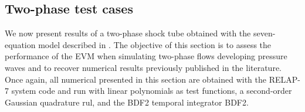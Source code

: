 \documentclass{inputs/mc2015}
\begin{document}
\subsection{Two-phase test cases} \label{sec:2-phase-problems}
%
We now present results of a two-phase shock tube obtained with the seven-equation model described in . %
The objective of this section is to assess the performance of the EVM when simulating two-phase flows developing pressure waves and to recover numerical results previously published in the literature. Once again, all numerical presented in this section are obtained with the RELAP-7 system code and run with linear polynomials as test functions, a second-order Gaussian quadrature rul, and the BDF2 temporal integrator BDF2. \\
\end{document}
